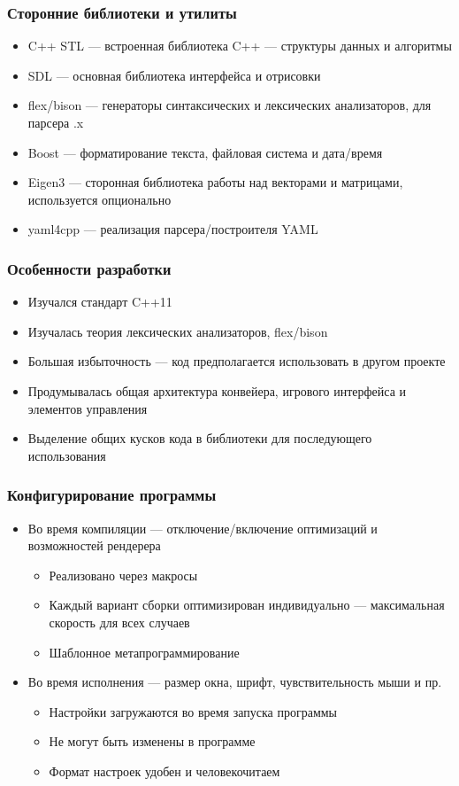 \documentclass{beamer}
\begin{document}
\begin{frame}
\frametitle{Сторонние библиотеки и утилиты}

\begin{itemize}
\item C++ STL --- встроенная библиотека C++ --- структуры данных и алгоритмы
\item SDL --- основная библиотека интерфейса и отрисовки
\item flex/bison --- генераторы синтаксических и лексических анализаторов, для парсера .x
\item Boost --- форматирование текста, файловая система и дата/время
\item Eigen3 --- сторонная библиотека работы над векторами и матрицами, используется опционально
\item yaml4cpp --- реализация парсера/построителя YAML
\end{itemize}
\end{frame}

\begin{frame}
\frametitle{Особенности разработки}

\begin{itemize}
\item Изучался стандарт C++11
\item Изучалась теория лексических анализаторов, flex/bison
\item Большая избыточность --- код предполагается использовать в другом проекте
\item Продумывалась общая архитектура конвейера, игрового интерфейса и элементов управления
\item Выделение общих кусков кода в библиотеки для последующего использования
\end{itemize}
\end{frame}

\begin{frame}
\frametitle{Конфигурирование программы}

\begin{itemize}
\item Во время компиляции --- отключение/включение оптимизаций и возможностей рендерера
  \begin{itemize}
  \item Реализовано через макросы
  \item Каждый вариант сборки оптимизирован индивидуально --- максимальная скорость для всех случаев
  \item Шаблонное метапрограммирование
  \end{itemize}
\item Во время исполнения --- размер окна, шрифт, чувствительность мыши и пр.
  \begin{itemize}
  \item Настройки загружаются во время запуска программы
  \item Не могут быть изменены в программе
  \item Формат настроек удобен и человекочитаем
  \end{itemize}
\end{itemize}
\end{frame}
\end{document}
